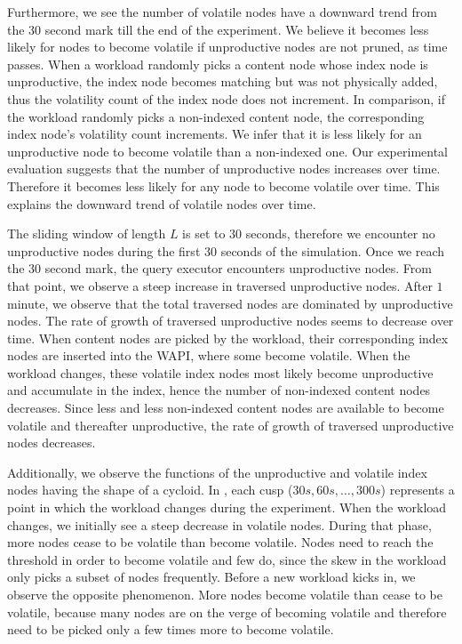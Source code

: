 \documentclass[abstracton,12pt]{scrartcl}
\theoremstyle{definition}
\begin{document}
Furthermore, we see the number of volatile nodes have a downward trend from the
30 second mark till the end of the experiment. We believe it becomes less likely
for nodes to become volatile if unproductive nodes are not pruned,
as time passes. When a workload randomly picks a content node whose index node is
unproductive, the index
node becomes matching but was not physically added, thus the volatility count of
the index node
does not increment. In comparison, if the workload randomly picks a non-indexed
content node, the corresponding index node's volatility count increments.
We infer that it is less
likely for an unproductive node to become volatile than a non-indexed one.
Our experimental evaluation suggests that the number of
unproductive nodes increases over time. Therefore it becomes less likely for any
node to become volatile over time. This explains the downward trend of
volatile nodes over time.

The sliding window of length $L$ is set to $30$ seconds, therefore we encounter no
unproductive nodes during the first $30$ seconds of the simulation. Once we
reach the $30$ second mark, the query executor encounters unproductive nodes.
From that point, we observe a steep increase in traversed unproductive nodes.
After $1$ minute, we observe that the total traversed nodes are dominated by
unproductive nodes. The rate of growth of traversed unproductive nodes seems to
decrease over time. When content nodes are picked by the
workload, their corresponding index nodes are inserted into the WAPI, where some
become volatile. When the workload changes, these volatile index nodes most
likely become unproductive and accumulate in the index, hence the number of non-indexed
content nodes decreases. Since less and less non-indexed content nodes are
available to become volatile and thereafter unproductive, the rate of growth of
traversed unproductive nodes decreases.


Additionally, we observe the functions of the unproductive and volatile index
nodes having the shape of a cycloid. In , each
cusp \cite{cusp} ($30 s, 60 s, \dots, 300 s$) represents a point in which the workload
changes during the experiment. When the workload changes, we initially see a
steep decrease in volatile nodes. During that phase, more nodes cease to be
volatile than become volatile. Nodes need to reach the threshold in order to
become volatile and few do, since the skew in the workload only picks a subset of
nodes frequently. Before a new workload kicks in, we observe the opposite
phenomenon. More nodes become volatile than cease to be volatile, because many nodes are
on the verge of becoming volatile and therefore need to be picked only a few
times more to become volatile. 
\end{document}
